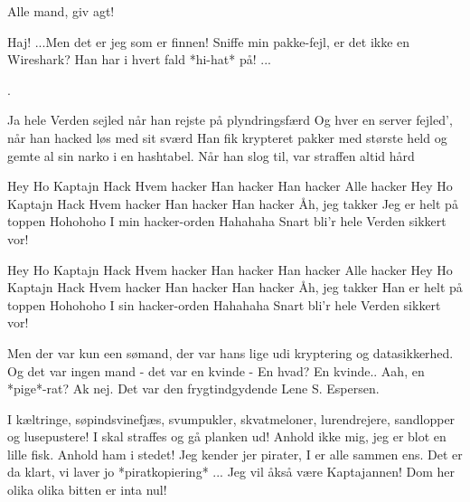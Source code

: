 \documentclass[a4paper,11pt]{article}
\begin{document}
\begin{song}
%

%
 Alle mand, giv agt!


 Haj! ...Men det er jeg som er finnen!
 Sniffe min pakke-fejl, er det ikke en Wireshark?
 Han har i hvert fald *hi-hat* på!
 ...

%
.

%
 Ja hele Verden sejled når han rejste på plyndringsfærd
	Og hver en server fejled', når han hacked løs med sit sværd
 Han fik krypteret pakker med største held
	og gemte al sin narko i en hashtabel.
 Når han slog til, var straffen altid hård

%
 Hey Ho Kaptajn Hack
 Hvem hacker
 Han hacker 
 Han hacker 
 Alle hacker
 Hey Ho Kaptajn Hack
 Hvem hacker
 Han hacker 
 Han hacker 
 Åh, jeg takker
	Jeg er helt på toppen
 Hohohoho
 I min hacker-orden
 Hahahaha
 Snart bli'r hele Verden sikkert vor!

 Hey Ho Kaptajn Hack
 Hvem hacker
 Han hacker 
 Han hacker 
 Alle hacker
 Hey Ho Kaptajn Hack
 Hvem hacker
 Han hacker 
 Han hacker 
 Åh, jeg takker
 Han er helt på toppen
	Hohohoho
	I sin hacker-orden
	Hahahaha
	Snart bli'r hele Verden sikkert vor!

%

%
 Men der var kun een sømand, der var hans lige udi kryptering og datasikkerhed. Og det var ingen mand - det var en kvinde -
 En hvad?
 En kvinde..
 Aah, en *pige*-rat?
 Ak nej. Det var den frygtindgydende Lene S. Espersen.


 I kæltringe, søpindsvinefjæs, svumpukler, skvatmeloner, lurendrejere, sandlopper og lusepustere! I skal straffes og gå planken ud!
 Anhold ikke mig, jeg er blot en lille fisk. Anhold ham i stedet! 
 Jeg kender jer pirater, I er alle sammen ens.
 Det er da klart, vi laver jo *piratkopiering*
 ...
 Jeg vil åkså være Kaptajannen! Dom her olika olika bitten er inta nul!


\end{song}
\end{document}
